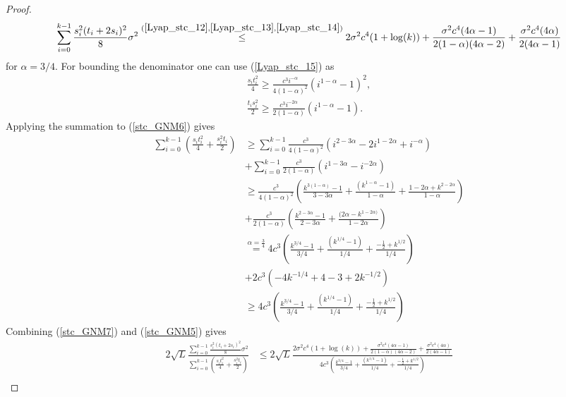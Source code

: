 \documentclass{article}
\theoremstyle{plain}
\theoremstyle{definition}
\theoremstyle{remark}
\begin{document}
\begin{proof}
\begin{align}\label{stc_GNM5}
    \sum_{i=0}^{k-1} \frac{s_i^2(t_i+2s_i)^2}{8}\sigma^2\overset{(\ref{Lyap_stc_12},\ref{Lyap_stc_13},\ref{Lyap_stc_14})}{\leq}2\sigma^2c^4(1+\log (k))+\frac{\sigma^2c^4(4\alpha -1)}{2(1-\alpha)(4\alpha -2)}+\frac{\sigma^2c^4(4\alpha )}{2(4\alpha -1)}
\end{align}
for $\alpha=3/4$. For bounding the denominator one can use (\ref{Lyap_stc_15}) as
        \begin{align}\label{stc_GNM6}
             \frac{s_it_i^2}{4}\geq \frac{c^3i^{-\alpha}}{4(1-\alpha)^2}(i^{1-\alpha}-1)^2,\nonumber\\
             \frac{t_is_i^2}{2}\geq \frac{c^3i^{-2\alpha}}{2(1-\alpha)}(i^{1-\alpha}-1).
         \end{align}
Applying the summation to (\ref{stc_GNM6}) gives
\begin{align}\label{stc_GNM7}
    \sum_{i=0}^{k-1}\left(\frac{s_it_i^2}{4}+\frac{s_i^2t_i}{2}\right)&\geq  \sum_{i=0}^{k-1} \frac{c^3}{4(1-\alpha)^2}(i^{2-3\alpha}-2i^{1-2\alpha}+i^{-\alpha})\nonumber\\
    & + \sum_{i=0}^{k-1} \frac{c^3}{2(1-\alpha)}(i^{1-3\alpha}-i^{-2\alpha})\nonumber\\
    &\geq \frac{c^3}{4(1-\alpha)^2}\left( \frac{k^{3(1-\alpha)}-1}{3-3\alpha} +\frac{(k^{1-\alpha}-1)}{1-\alpha}+\frac{1-2\alpha+k^{2-2\alpha}}{1-\alpha}\right)\nonumber\\
    &+\frac{c^3}{2(1-\alpha)}\left( \frac{k^{2-3\alpha}-1}{2-3\alpha} +\frac{(2\alpha-k^{1-2\alpha)}}{1-2\alpha}\right)\nonumber\\
    &\overset{\alpha=\tfrac{3}{4}}{=} 4c^3\left( \frac{k^{3/4}-1}{3/4} +\frac{(k^{1/4}-1)}{1/4}+\frac{-\tfrac{1}{2}+k^{1/2}}{1/4}\right)\nonumber\\
    &+2c^3\left( -4k^{-1/4}+4 -3+2k^{-1/2}\right)\nonumber\\
    &\geq 4c^3\left( \frac{k^{3/4}-1}{3/4} +\frac{(k^{1/4}-1)}{1/4}+\frac{-\tfrac{1}{2}+k^{1/2}}{1/4}\right)
\end{align}
Combining (\ref{stc_GNM7}) and (\ref{stc_GNM5}) gives
\begin{align}\label{stc_GNM8}
  2\sqrt{L}  \frac{ \sum_{i=0}^{k-1} \frac{s_i^2(t_i+2s_i)^2}{8}\sigma^2}{\sum_{i=0}^{k-1}\left(\frac{s_it_i^2}{4}+\frac{s_i^2t_i}{2}\right)}&\leq 2\sqrt{L}\frac{2\sigma^2c^4(1+\log (k))+\frac{\sigma^2c^4(4\alpha -1)}{2(1-\alpha)(4\alpha -2)}+\frac{\sigma^2c^4(4\alpha )}{2(4\alpha -1)}}{4c^3\left( \frac{k^{3/4}-1}{3/4} +\frac{(k^{1/4}-1)}{1/4}+\frac{-\tfrac{1}{2}+k^{1/2}}{1/4}\right)}\nonumber\\

\end{align}
\end{proof}
\end{document}
